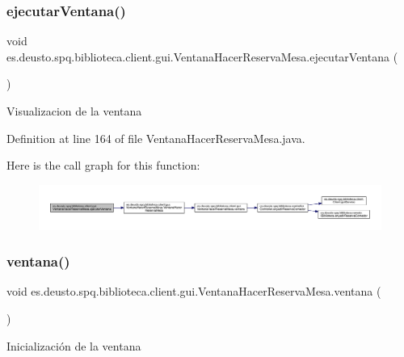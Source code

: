 \subsubsection{\texorpdfstring{ejecutar\+Ventana()}{ejecutarVentana()}}
{\footnotesize\ttfamily void es.\+deusto.\+spq.\+biblioteca.\+client.\+gui.\+Ventana\+Hacer\+Reserva\+Mesa.\+ejecutar\+Ventana (\begin{DoxyParamCaption}{ }\end{DoxyParamCaption})}

Visualizacion de la ventana 

Definition at line 164 of file Ventana\+Hacer\+Reserva\+Mesa.\+java.

Here is the call graph for this function\+:
\nopagebreak
\begin{figure}[H]
\begin{center}
\leavevmode
\includegraphics[width=350pt]{classes_1_1deusto_1_1spq_1_1biblioteca_1_1client_1_1gui_1_1_ventana_hacer_reserva_mesa_add76e330dbe570de87529a4a8323e2f2_cgraph}
\end{center}
\end{figure}
\mbox{\label{classes_1_1deusto_1_1spq_1_1biblioteca_1_1client_1_1gui_1_1_ventana_hacer_reserva_mesa_a02e760f41c682169da251b802cf65181}} 
\subsubsection{\texorpdfstring{ventana()}{ventana()}}
{\footnotesize\ttfamily void es.\+deusto.\+spq.\+biblioteca.\+client.\+gui.\+Ventana\+Hacer\+Reserva\+Mesa.\+ventana (\begin{DoxyParamCaption}{ }\end{DoxyParamCaption})}

Inicialización de la ventana 

